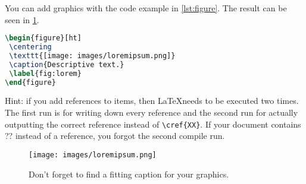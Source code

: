 \documentclass[parskip=full]{scrartcl}
\begin{document}
You can add graphics with the code example in \cref{lst:figure}. The result can be seen in \cref{fig:lorem}.

\begin{lstlisting}[language=tex, frame=single, caption={Code for adding a picture}, label=lst:figure, float, floatplacement=h]
\begin{figure}[ht]
 \centering
 \texttt{[image: images/loremipsum.png]}
 \caption{Descriptive text.} 
 \label{fig:lorem}
\end{figure} 
\end{lstlisting}

Hint: if you add references to items,
then \LaTeX needs to be executed two times. The first run is for writing down every reference and the second run for actually outputting the correct reference instead of \verb+\cref{XX}+.
If your document contains ?? instead of a reference, you forgot the second compile run.

\begin{figure}[ht]
 \centering %
 \texttt{[image: images/loremipsum.png]} %
 \caption{Don't forget to find a fitting caption for your graphics.} 
 \label{fig:lorem} %
\end{figure} 



\end{document}
